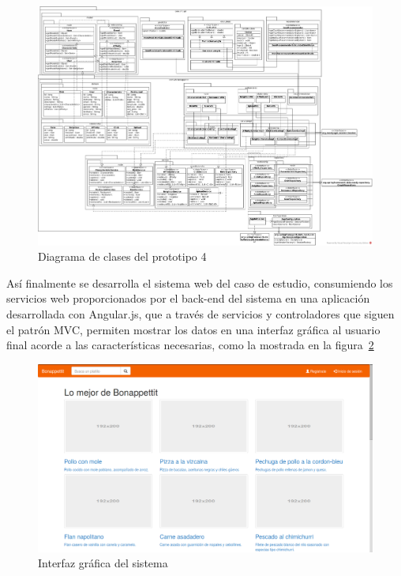     \begin{landscape}
      \begin{figure}[h!]
        \centering
        \includegraphics[width=25cm]{./images/monster_class}
        \caption{Diagrama de clases del prototipo 4}
        \label{fig:monster_classes}
      \end{figure}
    \end{landscape}

    Así finalmente se desarrolla el sistema web del caso de estudio, consumiendo los servicios web proporcionados por el back-end del sistema en una aplicación desarrollada con Angular.js, que a través de servicios y controladores que siguen el patrón MVC, permiten mostrar los datos en una interfaz gráfica al usuario final acorde a las características necesarias, como la mostrada en la figura~\ref{fig:final_bonappettit}


      \begin{figure}[h!]
        \centering
        \includegraphics[width=16cm]{./images/p4_bonappettit}
        \caption{Interfaz gráfica del sistema}
        \label{fig:final_bonappettit}
      \end{figure}


